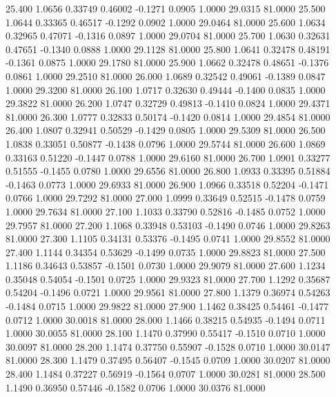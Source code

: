   25.400   1.0656   0.33749   0.46002  -0.1271   0.0905   1.0000  29.0315  81.0000
  25.500   1.0644   0.33365   0.46517  -0.1292   0.0902   1.0000  29.0464  81.0000
  25.600   1.0634   0.32965   0.47071  -0.1316   0.0897   1.0000  29.0704  81.0000
  25.700   1.0630   0.32631   0.47651  -0.1340   0.0888   1.0000  29.1128  81.0000
  25.800   1.0641   0.32478   0.48191  -0.1361   0.0875   1.0000  29.1780  81.0000
  25.900   1.0662   0.32478   0.48651  -0.1376   0.0861   1.0000  29.2510  81.0000
  26.000   1.0689   0.32542   0.49061  -0.1389   0.0847   1.0000  29.3200  81.0000
  26.100   1.0717   0.32630   0.49444  -0.1400   0.0835   1.0000  29.3822  81.0000
  26.200   1.0747   0.32729   0.49813  -0.1410   0.0824   1.0000  29.4371  81.0000
  26.300   1.0777   0.32833   0.50174  -0.1420   0.0814   1.0000  29.4854  81.0000
  26.400   1.0807   0.32941   0.50529  -0.1429   0.0805   1.0000  29.5309  81.0000
  26.500   1.0838   0.33051   0.50877  -0.1438   0.0796   1.0000  29.5744  81.0000
  26.600   1.0869   0.33163   0.51220  -0.1447   0.0788   1.0000  29.6160  81.0000
  26.700   1.0901   0.33277   0.51555  -0.1455   0.0780   1.0000  29.6556  81.0000
  26.800   1.0933   0.33395   0.51884  -0.1463   0.0773   1.0000  29.6933  81.0000
  26.900   1.0966   0.33518   0.52204  -0.1471   0.0766   1.0000  29.7292  81.0000
  27.000   1.0999   0.33649   0.52515  -0.1478   0.0759   1.0000  29.7634  81.0000
  27.100   1.1033   0.33790   0.52816  -0.1485   0.0752   1.0000  29.7957  81.0000
  27.200   1.1068   0.33948   0.53103  -0.1490   0.0746   1.0000  29.8263  81.0000
  27.300   1.1105   0.34131   0.53376  -0.1495   0.0741   1.0000  29.8552  81.0000
  27.400   1.1144   0.34354   0.53629  -0.1499   0.0735   1.0000  29.8823  81.0000
  27.500   1.1186   0.34643   0.53857  -0.1501   0.0730   1.0000  29.9079  81.0000
  27.600   1.1234   0.35048   0.54054  -0.1501   0.0725   1.0000  29.9323  81.0000
  27.700   1.1292   0.35687   0.54204  -0.1496   0.0721   1.0000  29.9561  81.0000
  27.800   1.1379   0.36974   0.54263  -0.1484   0.0715   1.0000  29.9822  81.0000
  27.900   1.1462   0.38425   0.54461  -0.1477   0.0712   1.0000  30.0018  81.0000
  28.000   1.1466   0.38215   0.54935  -0.1494   0.0711   1.0000  30.0055  81.0000
  28.100   1.1470   0.37990   0.55417  -0.1510   0.0710   1.0000  30.0097  81.0000
  28.200   1.1474   0.37750   0.55907  -0.1528   0.0710   1.0000  30.0147  81.0000
  28.300   1.1479   0.37495   0.56407  -0.1545   0.0709   1.0000  30.0207  81.0000
  28.400   1.1484   0.37227   0.56919  -0.1564   0.0707   1.0000  30.0281  81.0000
  28.500   1.1490   0.36950   0.57446  -0.1582   0.0706   1.0000  30.0376  81.0000

